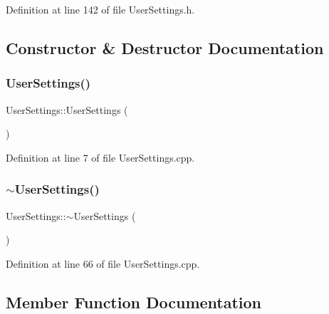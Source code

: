 Definition at line 142 of file User\+Settings.\+h.



\subsection{Constructor \& Destructor Documentation}
\mbox{\label{class_user_settings_addb9748b9f0ee298b8e23dee74edfc91}} 
\subsubsection{\texorpdfstring{User\+Settings()}{UserSettings()}}
{\footnotesize\ttfamily User\+Settings\+::\+User\+Settings (\begin{DoxyParamCaption}{ }\end{DoxyParamCaption})}



Definition at line 7 of file User\+Settings.\+cpp.

\mbox{\label{class_user_settings_abf12285ea58dcf1f4b34f5f68a52b580}} 
\subsubsection{\texorpdfstring{$\sim$\+User\+Settings()}{~UserSettings()}}
{\footnotesize\ttfamily User\+Settings\+::$\sim$\+User\+Settings (\begin{DoxyParamCaption}{ }\end{DoxyParamCaption})}



Definition at line 66 of file User\+Settings.\+cpp.



\subsection{Member Function Documentation}
\mbox{\label{class_user_settings_ae4235bad48b9b2f0549b9678cfd74353}} 
